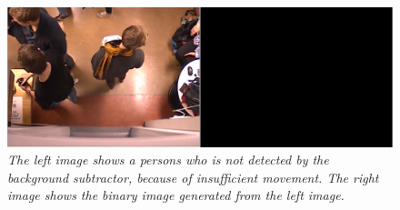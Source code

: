 \begin{figure}[htb]
	\centering
	\includegraphics[width=\linewidth]{images/bg_fail.png}
	\caption[An example of a failed detection detection using background subtraction.]{\textit{The left image shows a persons who is not detected by the background subtractor, because of insufficient movement. The right image shows the binary image generated from the left image. 
	}}
	\label{fig:bg_fail}  %
\end{figure}

